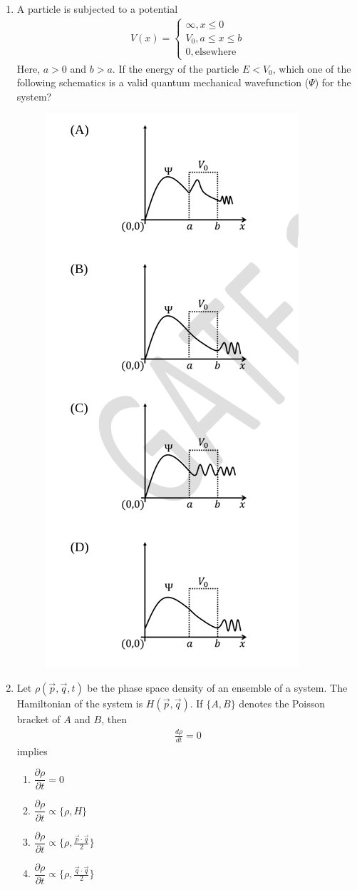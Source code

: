 \documentclass[journal,12pt,onecolumn]{IEEEtran}
\theoremstyle{remark}
\begin{document}
\begin{enumerate}
\item A particle is subjected to a potential
\begin{align}
V(x) =
\begin{cases}
\infty,  x \leq 0 \\
V_0,  a \leq x \leq b \\
0,  \text{elsewhere}
\end{cases}
\end{align}
Here, $a>0$ and $b>a$. If the energy of the particle $E < V_0$, which one of the following schematics is a valid quantum mechanical wavefunction ($\Psi$) for the system?
\begin{figure}[H]
    \centering
    \includegraphics[width = 0.4\columnwidth]{fig/Q22.png}
    \caption*{}
    \label{fig: Q22}
\end{figure}
\item Let $\rho(\vec{p}, \vec{q}, t)$ be the phase space density of an ensemble of a system. The Hamiltonian of the system is $H(\vec{p}, \vec{q})$. If $\{A,B\}$ denotes the Poisson bracket of $A$ and $B$, then
\begin{align}
\frac{d\rho}{dt} = 0
\end{align}
implies
\begin{enumerate}
    \item $ \dfrac{\partial\rho}{\partial t} = 0$
    \item $ \dfrac{\partial\rho}{\partial t} \propto \{\rho, H\}$
    \item $\dfrac{\partial\rho}{\partial t} \propto \{ \rho, \frac{\vec{p} \cdot \vec{q}}{2}\}$
    \item $\dfrac{\partial\rho}{\partial t} \propto \{ \rho, \frac{\vec{q} \cdot \vec{q}}{2}\}$
    

\end{enumerate}
\end{enumerate}
\end{document}
